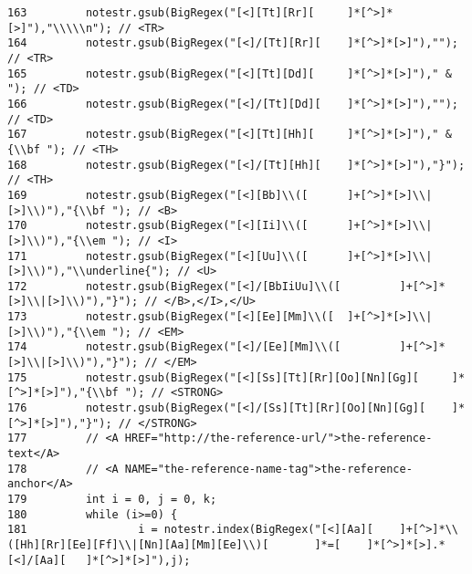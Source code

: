\begin{verbatim}
163         notestr.gsub(BigRegex("[<][Tt][Rr][     ]*[^>]*[>]"),"\\\\\n"); // <TR>
164         notestr.gsub(BigRegex("[<]/[Tt][Rr][    ]*[^>]*[>]"),""); // <TR>
165         notestr.gsub(BigRegex("[<][Tt][Dd][     ]*[^>]*[>]")," & "); // <TD>
166         notestr.gsub(BigRegex("[<]/[Tt][Dd][    ]*[^>]*[>]"),""); // <TD>
167         notestr.gsub(BigRegex("[<][Tt][Hh][     ]*[^>]*[>]")," & {\\bf "); // <TH>
168         notestr.gsub(BigRegex("[<]/[Tt][Hh][    ]*[^>]*[>]"),"}"); // <TH>
169         notestr.gsub(BigRegex("[<][Bb]\\([      ]+[^>]*[>]\\|[>]\\)"),"{\\bf "); // <B>
170         notestr.gsub(BigRegex("[<][Ii]\\([      ]+[^>]*[>]\\|[>]\\)"),"{\\em "); // <I>
171         notestr.gsub(BigRegex("[<][Uu]\\([      ]+[^>]*[>]\\|[>]\\)"),"\\underline{"); // <U>
172         notestr.gsub(BigRegex("[<]/[BbIiUu]\\([         ]+[^>]*[>]\\|[>]\\)"),"}"); // </B>,</I>,</U>
173         notestr.gsub(BigRegex("[<][Ee][Mm]\\([  ]+[^>]*[>]\\|[>]\\)"),"{\\em "); // <EM>
174         notestr.gsub(BigRegex("[<]/[Ee][Mm]\\([         ]+[^>]*[>]\\|[>]\\)"),"}"); // </EM>
175         notestr.gsub(BigRegex("[<][Ss][Tt][Rr][Oo][Nn][Gg][     ]*[^>]*[>]"),"{\\bf "); // <STRONG>
176         notestr.gsub(BigRegex("[<]/[Ss][Tt][Rr][Oo][Nn][Gg][    ]*[^>]*[>]"),"}"); // </STRONG>
177         // <A HREF="http://the-reference-url/">the-reference-text</A>
178         // <A NAME="the-reference-name-tag">the-reference-anchor</A>
179         int i = 0, j = 0, k;
180         while (i>=0) {
181                 i = notestr.index(BigRegex("[<][Aa][    ]+[^>]*\\([Hh][Rr][Ee][Ff]\\|[Nn][Aa][Mm][Ee]\\)[       ]*=[    ]*[^>]*[>].*[<]/[Aa][   ]*[^>]*[>]"),j);

\end{verbatim}
